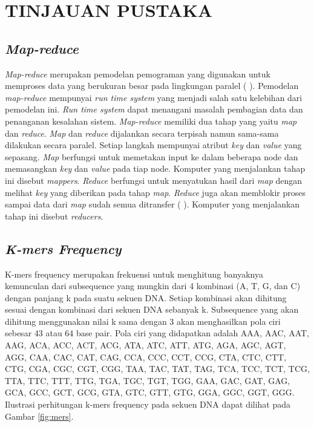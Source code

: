 \section*{TINJAUAN PUSTAKA} %
\subsection*{\textit{Map-reduce}}
\textit{Map-reduce} merupakan pemodelan pemograman yang digunakan untuk memproses data yang berukuran besar pada lingkungan paralel (\citeauthor{DEAN2004} \cite*{DEAN2004}). Pemodelan \textit{map-reduce} mempunyai \textit{run time system} yang menjadi salah satu kelebihan dari pemodelan ini. \textit{Run time system} dapat menangani masalah pembagian data dan penanganan kesalahan sistem. \textit{Map-reduce} memiliki dua tahap yang yaitu \textit{map} dan \textit{reduce}. \textit{Map} dan \textit{reduce} dijalankan secara terpisah namun sama-sama dilakukan secara paralel. Setiap langkah mempunyai atribut \textit{key} dan \textit{value} yang sepasang. \textit{Map} berfungsi untuk memetakan input ke dalam beberapa node dan memasangkan \textit{key} dan \textit{value} pada tiap node.  Komputer yang menjalankan tahap ini disebut \textit{mappers}. \textit{Reduce} berfungsi untuk menyatukan hasil dari \textit{map} dengan melihat \textit{key} yang diberikan pada tahap \textit{map}. \textit{Reduce} juga akan memblokir proses sampai data dari \textit{map} sudah semua ditransfer (\citeauthor{TAYLOR2010} \cite*{TAYLOR2010}). Komputer yang menjalankan tahap ini disebut \textit{reducers}.

\subsection*{\textit{K-mers Frequency}}
K-mers frequency merupakan frekuensi untuk menghitung banyaknya kemunculan dari subsequence yang mungkin dari 4 kombinasi (A, T, G, dan C) dengan panjang k pada suatu sekuen DNA. Setiap kombinasi akan dihitung sesuai dengan kombinasi dari sekuen DNA sebanyak k. Subsequence yang akan dihitung menggunakan nilai k sama dengan 3 akan menghasilkan pola ciri sebesar 43 atau 64 base pair. Pola ciri yang didapatkan adalah {AAA, AAC, AAT, AAG, ACA, ACC, ACT, ACG, ATA, ATC, ATT, ATG, AGA, AGC, AGT, AGG, CAA, CAC, CAT, CAG, CCA, CCC, CCT, CCG, CTA, CTC, CTT, CTG, CGA, CGC, CGT, CGG, TAA, TAC, TAT, TAG, TCA, TCC, TCT, TCG, TTA, TTC, TTT, TTG, TGA, TGC, TGT, TGG, GAA, GAC, GAT, GAG, GCA, GCC, GCT, GCG, GTA, GTC, GTT, GTG, GGA, GGC, GGT, GGG}. Ilustrasi perhitungan k-mers frequency  pada sekuen DNA dapat dilihat pada Gambar \ref{fig:mers}.


